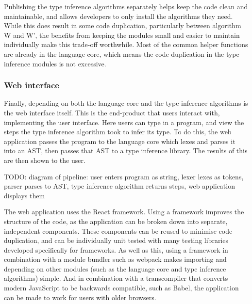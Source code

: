 \documentclass[a4paper,fleqn,12pt]{article}
\begin{document}
Publishing the type inference algorithms separately helps keep the code clean and maintainable, and allows developers to only install the algorithms they need. While this does result in some code duplication, particularly between algorithm W and W’, the benefits from keeping the modules small and easier to maintain individually make this trade-off worthwhile. Most of the common helper functions are already in the language core, which means the code duplication in the type inference modules is not excessive.
\subsubsection{Web interface}\label{id:h.q67ivlz7h61r}
Finally, depending on both the language core and the type inference algorithms is the web interface itself. This is the end-product that users interact with, implementing the user interface. Here users can type in a program, and view the steps the type inference algorithm took to infer its type. To do this, the web application passes the program to the language core which lexes and parses it into an AST, then passes that AST to a type inference library. The results of this are then shown to the user.

TODO: diagram of pipeline: user enters program as string, lexer lexes as tokens, parser parses to AST, type inference algorithm returns steps, web application displays them

The web application uses the React framework. Using a framework improves the structure of the code, as the application can be broken down into separate, independent components. These components can be reused to minimise code duplication, and can be individually unit tested with many testing libraries developed specifically for frameworks. As well as this, using a framework in combination with a module bundler such as webpack makes importing and depending on other modules (such as the language core and type inference algorithms) simple. And in combination with a transcompiler that converts modern JavaScript to be backwards compatible, such as Babel, the application can be made to work for users with older browsers.
\end{document}
